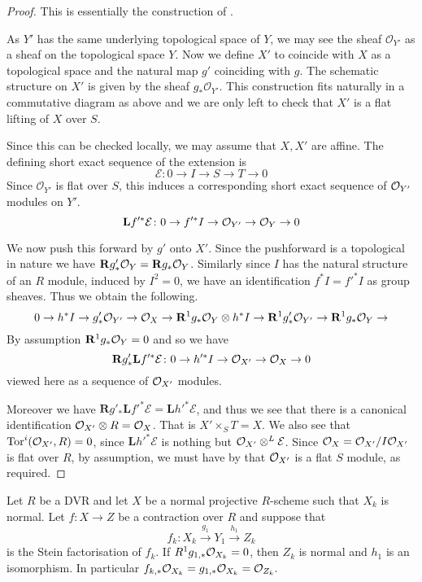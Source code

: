\begin{proof}
	This is essentially the construction of \cite[Theorem 3.1]{cynk2009small}.
	
	As $Y'$ has the same underlying topological space of $Y$, we may see the sheaf $\mathcal{O}_{Y'}$ as a sheaf on the topological space $Y$. 	
	Now we define $X'$ to coincide with $X$ as a topological space and the natural map $g'$ coinciding with $g$. The schematic structure on $X'$ is given by the sheaf $g_*\mathcal{O}_{Y'}$. 
	This construction fits naturally in a commutative diagram as above and we are only left to check that $X'$ is a flat lifting of $X$ over $S$.
	
	Since this can be checked locally, we may assume that $X, X'$ are affine.
	The defining short exact sequence of the extension is
	\[\mathcal{E} \colon 0 \to I \to S \to T \to 0 \]
	Since $\mathcal{O}_{Y'}$ is flat over $S$, this induces a corresponding short exact sequence of $\ox[Y']$ modules on $Y'$.
	\[ \mathbf{L}f'^{*}\mathcal{E} \colon 0 \to f'^{*}I \to \ox[Y'] \to \ox[Y] \to 0 \]
	
	We now push this forward by $g'$ onto $X'$. Since the pushforward is a topological in nature we have $\mathbf{R}g'_{*}\ox[Y]=\mathbf{R}g_{*}\ox[Y]$. Similarly since $I$ has the natural structure of an $R$ module, induced by $I^{2}=0$, we have an identification $f^{*}I=f'^{*}I$ as group sheaves.
	Thus we obtain the following.
	\[0 \to h^{*}I \to g'_{*}\ox[Y'] \to \ox[X] \to \mathbf{R}^{1}g_{*}\ox[Y] \otimes h^{*}I \to \mathbf{R}^{1}g'_{*}\ox[Y'] \to \mathbf{R}^{1}g_{*}\ox[Y] \to \] 
	By assumption $\mathbf{R}^{1}g_{*}\ox[Y]=0$ and so we have
	\[\mathbf{R}g'_{*}\mathbf{L}f'^{*}\mathcal{E}\colon 0 \to h'^{*}I \to \ox[X'] \to \ox[X] \to 0\]
	viewed here as a sequence of $\ox[X']$ modules.
	
	Moreover we have $\mathbf{R}g'_{*}\mathbf{L}f'^{*}\mathcal{E}=\mathbf{L}h'^{*}\mathcal{E}$, and thus we see that there is a canonical identification $\ox[X']\otimes R= \ox[X]$. That is $X' \times_{S} T= X$. We also see that $\textup{Tor}^{i}(\ox[X'], R)=0$, since $\mathbf{L}h'^{*}\mathcal{E}$ is nothing but $\ox[X'] \otimes^{L} \mathcal{E}$. Since $\ox= \ox[X']/ I \ox[X']$ is flat over $R$, by assumption, we must have by \cite[\href{https://stacks.math.columbia.edu/tag/0AS8}{Tag 0AS8}]{stacks-project} that $\ox[X']$ is a flat $S$ module, as required.
	
\end{proof}

\begin{theorem}\label{adj-push}
	Let $R$ be a DVR and let $X$ be a normal projective $R$-scheme such that $X_{k}$ is normal. 
	Let $f \colon X \to Z$ be a contraction over $R$ and suppose that $$f_{k}\colon X_{k} \xrightarrow{g_{1}} Y_{1} \xrightarrow{h_{1}} Z_{k}$$ is the Stein factorisation of $f_{k}$. If $R^{1}g_{1,*} \ox[X_{k}]=0$, then $Z_k$ is normal and $h_{1}$ is an isomorphism. In particular $f_{k,*}\ox[X_{k}]=g_{1,*}\ox[X_{k}]=\ox[Z_{k}].$
\end{theorem}

